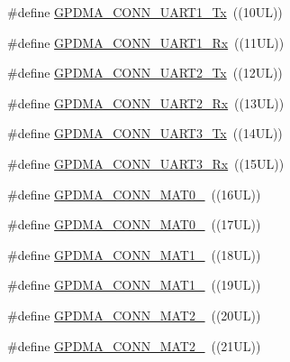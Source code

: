 \begin{DoxyCompactItemize}
\item 
\#define \hyperlink{group___g_p_d_m_a___public___macros_gaea5294ba355bbe1efed07d65718c7e83}{\-G\-P\-D\-M\-A\-\_\-\-C\-O\-N\-N\-\_\-\-U\-A\-R\-T1\-\_\-\-Tx}~((10\-U\-L))
\item 
\#define \hyperlink{group___g_p_d_m_a___public___macros_gaf0eea043e066244910dbe7608de732b5}{\-G\-P\-D\-M\-A\-\_\-\-C\-O\-N\-N\-\_\-\-U\-A\-R\-T1\-\_\-\-Rx}~((11\-U\-L))
\item 
\#define \hyperlink{group___g_p_d_m_a___public___macros_ga884e268ae363efcde9c3d5e791145cb1}{\-G\-P\-D\-M\-A\-\_\-\-C\-O\-N\-N\-\_\-\-U\-A\-R\-T2\-\_\-\-Tx}~((12\-U\-L))
\item 
\#define \hyperlink{group___g_p_d_m_a___public___macros_gacdfdf222b40acd9c57260c7b493cc3b5}{\-G\-P\-D\-M\-A\-\_\-\-C\-O\-N\-N\-\_\-\-U\-A\-R\-T2\-\_\-\-Rx}~((13\-U\-L))
\item 
\#define \hyperlink{group___g_p_d_m_a___public___macros_gab3d5bed081680418d665767b721bcc75}{\-G\-P\-D\-M\-A\-\_\-\-C\-O\-N\-N\-\_\-\-U\-A\-R\-T3\-\_\-\-Tx}~((14\-U\-L))
\item 
\#define \hyperlink{group___g_p_d_m_a___public___macros_ga4c209fa5df563dc3b97333e34b24335d}{\-G\-P\-D\-M\-A\-\_\-\-C\-O\-N\-N\-\_\-\-U\-A\-R\-T3\-\_\-\-Rx}~((15\-U\-L))
\item 
\#define \hyperlink{group___g_p_d_m_a___public___macros_ga4be28419e516ded6affb01c411790f42}{\-G\-P\-D\-M\-A\-\_\-\-C\-O\-N\-N\-\_\-\-M\-A\-T0\-\_}~((16\-U\-L))
\item 
\#define \hyperlink{group___g_p_d_m_a___public___macros_ga87aa4ae7b9b68cc2c145d0ae6986edf2}{\-G\-P\-D\-M\-A\-\_\-\-C\-O\-N\-N\-\_\-\-M\-A\-T0\-\_}~((17\-U\-L))
\item 
\#define \hyperlink{group___g_p_d_m_a___public___macros_gac6c7b9c39c1a03eb71f1f869b995cb1c}{\-G\-P\-D\-M\-A\-\_\-\-C\-O\-N\-N\-\_\-\-M\-A\-T1\-\_}~((18\-U\-L))
\item 
\#define \hyperlink{group___g_p_d_m_a___public___macros_gaf0a360f1cd012b454bd28d89893e2121}{\-G\-P\-D\-M\-A\-\_\-\-C\-O\-N\-N\-\_\-\-M\-A\-T1\-\_}~((19\-U\-L))
\item 
\#define \hyperlink{group___g_p_d_m_a___public___macros_ga72ce3c7080bb473643f64f00ca6d0d37}{\-G\-P\-D\-M\-A\-\_\-\-C\-O\-N\-N\-\_\-\-M\-A\-T2\-\_}~((20\-U\-L))
\item 
\#define \hyperlink{group___g_p_d_m_a___public___macros_ga1fc900a69aeaf2ddadd72214650acc04}{\-G\-P\-D\-M\-A\-\_\-\-C\-O\-N\-N\-\_\-\-M\-A\-T2\-\_}~((21\-U\-L))
\item 

\end{DoxyCompactItemize}
